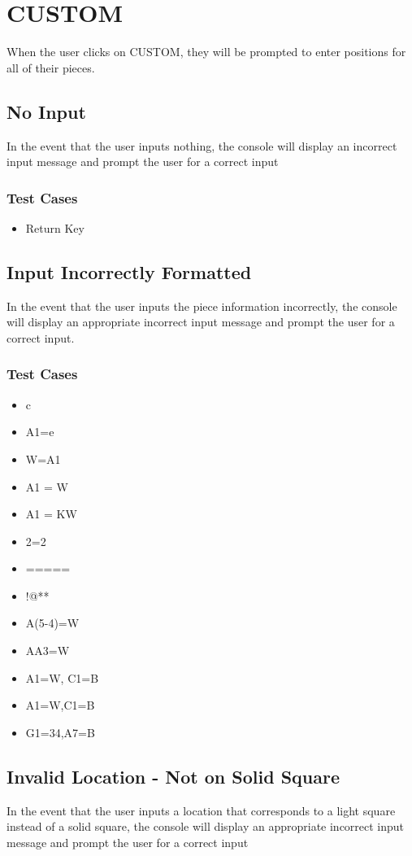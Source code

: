 \documentclass{article}
\begin{document}
\section{CUSTOM}
When the user clicks on CUSTOM, they will be prompted to enter positions for all of their pieces.

\subsection{No Input}
In the event that the user inputs nothing, the console will display an incorrect input message and prompt the user for a correct input

\subsubsection*{Test Cases}
\begin{itemize}
\item Return Key
\end{itemize}

\subsection{Input Incorrectly Formatted}
In the event that the user inputs the piece information incorrectly, the console will display an appropriate incorrect input message and prompt the user for a correct input. 

\subsubsection*{Test Cases}
\begin{itemize}
\item c
\item A1=e
\item W=A1
\item A1 = W
\item A1 = KW
\item 2=2
\item =====
\item !@**
\item A(5-4)=W
\item AA3=W
\item A1=W, C1=B
\item A1=W,\qquad C1=B
\item G1=34,A7=B
\end{itemize}

\subsection{Invalid Location - Not on Solid Square}
In the event that the user inputs a location that corresponds to a light square instead of a solid square, the console will display an appropriate incorrect input message and prompt the user for a correct input
\end{document}
